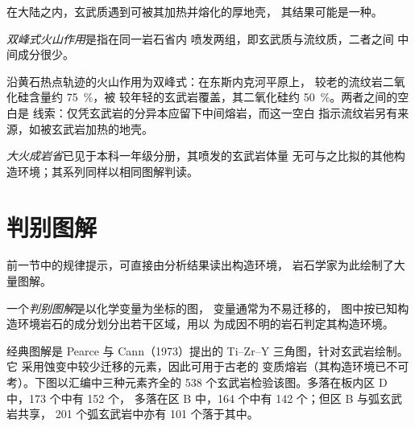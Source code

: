 在大陆之内，玄武质遇到可被其加热并熔化的厚地壳，
其结果可能是一种。

\begin{definition}[双峰式火山作用]\label{def:b2:magmatic-series:bimodal}
\emph{双峰式火山作用}是指在同一岩石省内
喷发两组，即玄武质与流纹质，二者之间
中间成分很少。
\end{definition}

沿黄石热点轨迹的火山作用为双峰式：在东斯内克河平原上，
较老的流纹岩二氧化硅含量约 \qty{75}{\percent}，被
较年轻的玄武岩覆盖，其二氧化硅约 \qty{50}{\percent}。两者之间的空白是
线索：仅凭玄武岩的分异本应留下中间熔岩，而这一空白
指示流纹岩另有来源，如被玄武岩加热的地壳。

\emph{大火成岩省}已见于本科一年级分册，其喷发的玄武岩体量
无可与之比拟的其他构造环境；其系列同样以相同图解判读。

\section{判别图解}\label{sec:b2:magmatic-series:discrimination}

前一节中的规律提示，可直接由分析结果读出构造环境，
岩石学家为此绘制了大量图解。

\begin{definition}[判别图解]\label{def:b2:magmatic-series:discrimination}
一个\emph{判别图解}是以化学变量为坐标的图，
变量通常为不易迁移的，
图中按已知构造环境岩石的成分划分出若干区域，用以
为成因不明的岩石判定其构造环境。
\end{definition}

经典图解是 Pearce 与 Cann（1973）提出的 Ti--Zr--Y 三角图，针对玄武岩绘制。它
采用蚀变中较少迁移的元素，因此可用于古老的
变质熔岩（其构造环境已不可考）。下图以汇编中三种元素齐全的
538 个玄武岩检验该图。多落在板内区 D 中，173 个中有 152 个，
多落在区 B 中，164 个中有 142 个；但区 B 与弧玄武岩共享，
201 个弧玄武岩中亦有 101 个落于其中。

